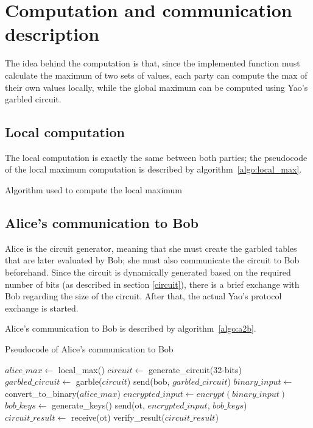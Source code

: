 \section{Computation and communication description}

The idea behind the computation is that, since the implemented function must calculate the maximum of two sets of values, each party can compute the max of their own values locally, while the global maximum can be computed using Yao's garbled circuit.

\subsection{Local computation}

The local computation is exactly the same between both parties; the pseudocode of the local maximum computation is described by algorithm~\ref{algo:local_max}.

\begin{algorithm}
    \DontPrintSemicolon
    \caption{Algorithm used to compute the local maximum}\label{algo:local_max}
    
\end{algorithm}

\subsection{Alice's communication to Bob}

Alice is the circuit generator, meaning that she must create the garbled tables that are later evaluated by Bob; she must also communicate the circuit to Bob beforehand. Since the circuit is dynamically generated based on the required number of bits (as described in section \ref{circuit}), there is a brief exchange with Bob regarding the size of the circuit. After that, the actual Yao's protocol exchange is started.

Alice's communication to Bob is described by algorithm~\ref{algo:a2b}.

\begin{algorithm}
    \DontPrintSemicolon
    \caption{Pseudocode of Alice's communication to Bob}\label{algo:a2b}
    $alice\_max \gets$ local\_max()\;
    \BlankLine
    $circuit \gets$ generate\_circuit(32-bits)\;
    $garbled\_circuit \gets$ garble($circuit$)\;
    send(bob, $garbled\_circuit$)\;
    $binary\_input \gets $ convert\_to\_binary($alice\_max$)\;
    $encrypted\_input \gets encrypt(binary\_input)$\;
    $bob\_keys \gets $ generate\_keys()\;
    send(ot, $encrypted\_input$, $bob\_keys$)\;
    $circuit\_result \gets$ receive(ot)
    \BlankLine
    verify\_result($circuit\_result$)
\end{algorithm}

